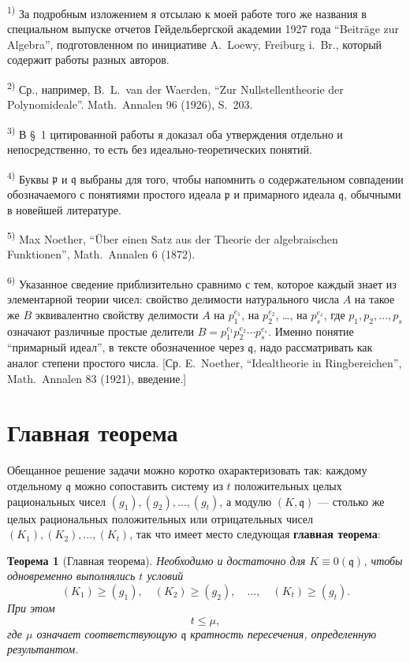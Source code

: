 \documentclass[11pt]{article}
\newcommand{\foreign}[1]{#1}
\theoremstyle{plain}
\newtheorem{satz}{Теорема}
\begin{document}
{\footnotesize
\textsuperscript{1)} За подробным изложением я отсылаю к моей работе того же
названия в специальном выпуске отчетов Гейдельбергской академии 1927 года
``Beiträge zur Algebra'', подготовленном по инициативе A.\ Loewy,
Freiburg i.\ Br., который содержит работы разных авторов.

\textsuperscript{2)} Ср., например, B.\ L.\ van der Waerden, ``Zur Nullstellentheorie der Polynomideale''.
\foreign{Math.\ Annalen} 96 (1926), S.~203.

\textsuperscript{3)} В \S~1 цитированной работы я доказал оба утверждения
отдельно и непосредственно, то есть без идеально-теоретических понятий.

\textsuperscript{4)} Буквы $\mathfrak{p}$ и $\mathfrak{q}$ выбраны для того,
чтобы напомнить о содержательном совпадении обозначаемого с понятиями
простого идеала $\mathfrak{p}$ и примарного идеала $\mathfrak{q}$, обычными
в новейшей литературе.

\textsuperscript{5)} Max Noether, ``Über einen Satz aus der Theorie der algebraischen Funktionen'',
\foreign{Math.\ Annalen} 6 (1872).

\textsuperscript{6)} Указанное сведение приблизительно сравнимо с тем, которое
каждый знает из элементарной теории чисел: свойство делимости натурального
числа $A$ на такое же $B$ эквивалентно свойству делимости $A$ на
$p_{1}^{e_{1}}$, на $p_{2}^{e_{2}}$, \ldots, на $p_{s}^{e_{s}}$, где
$p_{1}, p_{2}, \ldots, p_{s}$ означают различные простые делители
$B = p_{1}^{e_{1}}p_{2}^{e_{2}} \cdots p_{s}^{e_{s}}$. Именно понятие
``примарный идеал'', в тексте обозначенное через $\mathfrak{q}$, надо
рассматривать как аналог степени простого числа. [Ср. E.\ Noether,
``Idealtheorie in Ringbereichen'', \foreign{Math.\ Annalen} 83 (1921), введение.]
}

\newpage
\section*{Главная теорема}

Обещанное решение задачи можно коротко охарактеризовать так:
каждому отдельному $\mathfrak{q}$ можно сопоставить систему из $t$
положительных целых рациональных чисел
$(g_{1}), (g_{2}), \ldots, (g_{t})$, а модулю $(K, \mathfrak{q})$ ---
столько же целых рациональных положительных или отрицательных чисел
$(K_{1}), (K_{2}), \ldots, (K_{t})$, так что имеет место следующая
\textbf{главная теорема}:

\begin{satz}[Главная теорема]\label{satz:kap-II}
Необходимо и достаточно для $K \equiv 0(\mathfrak{q})$, чтобы
одновременно выполнялись $t$ условий
\[
(K_{1}) \geq (g_{1}), \quad (K_{2}) \geq (g_{2}), \quad\ldots,\quad (K_{t}) \geq (g_{t}).
\]
При этом
\[
t \leq \mu,
\]
где $\mu$ означает соответствующую $\mathfrak{q}$ кратность
пересечения, определенную результантом.
\end{satz}
\end{document}

